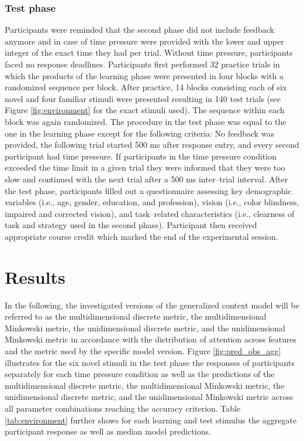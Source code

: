 \documentclass[a4paper,man,natbib]{apa6}
\begin{document}
\subsubsection{Test phase}
Participants were reminded that the second phase did not include feedback anymore and in case of time pressure were provided with the lower and upper integer of the exact time they had per trial. Without time pressure, participants faced no response deadlines. Participants first performed 32 practice trials in which the products of the learning phase were presented in four blocks with a randomized sequence per block. After practice, 14 blocks consisting each of six novel and four familiar stimuli were presented resulting in 140 test trials (see Figure \ref{fig:environment} for the exact stimuli used). The sequence within each block was again randomized. The procedure in the test phase was equal to the one in the learning phase except for the following criteria: No feedback was provided, the following trial started 500 ms after response entry, and every second participant had time pressure. If participants in the time pressure condition exceeded the time limit in a given trial they were informed that they were too slow and continued with the next trial after a 500 ms inter--trial interval. After the test phase, participants filled out a questionnaire assessing key demographic variables (i.e., age, gender, education, and profession), vision (i.e., color blindness, impaired and corrected vision), and task--related characteristics (i.e., clearness of task and strategy used in the second phase). Participant then received appropriate course credit which marked the end of the experimental session.

\section{Results}
In the following, the investigated versions of the generalized context model \citep{nosofsky1989further} will be referred to as the multidimensional discrete metric, the multidimensional Minkowski metric, the unidimensional discrete metric, and the unidimensional Minkowski metric in accordance with the distribution of attention across features and the metric used by the specific model version. Figure \ref{fig:pred_obs_agg} illustrates for the six novel stimuli in the test phase the responses of participants separately for each time pressure condition as well as the predictions of the multidimensional discrete metric, the multidimensional Minkowski metric, the unidimensional discrete metric, and the unidimensional Minkowski metric across all parameter combinations reaching the accuracy criterion. Table \ref{tab:environment} further shows for each learning and test stimulus the aggregate participant response as well as median model predictions.
\end{document}
